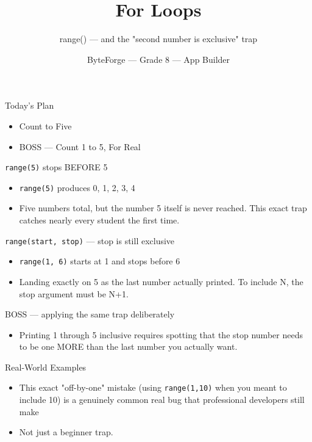 \documentclass[aspectratio=169]{beamer}
\title{For Loops}
\subtitle{range() — and the "second number is exclusive" trap}
\author{ByteForge --- Grade 8 --- App Builder}
\date{}
\begin{document}
\begin{frame}
    \titlepage
\end{frame}

\begin{frame}{Today's Plan}
    \begin{itemize}
        \item Count to Five
        \item[$\bigstar$] BOSS --- Count 1 to 5, For Real
    \end{itemize}
\end{frame}

\begin{frame}{\texttt{range(5)} stops BEFORE 5}
    \large
    \begin{itemize}
        \item \texttt{range(5)} produces 0, 1, 2, 3, 4
        \item Five numbers total, but the number 5 itself is never reached. This exact trap catches nearly every student the first time.
    \end{itemize}
\end{frame}


\begin{frame}{\texttt{range(start, stop)} — stop is still exclusive}
    \large
    \begin{itemize}
        \item \texttt{range(1, 6)} starts at 1 and stops before 6
        \item Landing exactly on 5 as the last number actually printed. To include N, the stop argument must be N+1.
    \end{itemize}
\end{frame}


\begin{frame}{BOSS — applying the same trap deliberately}
    \large
    \begin{itemize}
        \item Printing 1 through 5 inclusive requires spotting that the stop number needs to be one MORE than the last number you actually want.
    \end{itemize}
\end{frame}

\begin{frame}{Real-World Examples}
    \large
    \begin{itemize}
        \item This exact "off-by-one" mistake (using \texttt{range(1,10)} when you meant to include 10) is a genuinely common real bug that professional developers still make
        \item Not just a beginner trap.
    \end{itemize}
\end{frame}
\end{document}
